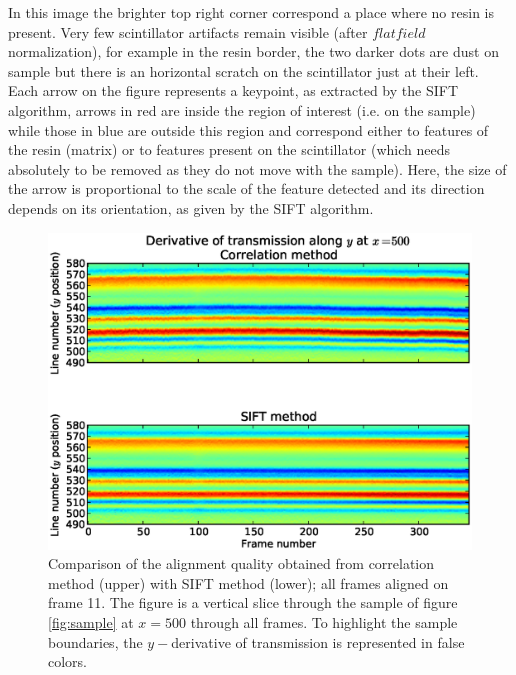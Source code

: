 \documentclass[preprint]{iucr}
\begin{document}
In this image the brighter top right corner correspond a place where no resin is
present. Very few scintillator artifacts remain visible (after $flat field$
normalization), for example in the resin border, the two darker dots are dust on
sample but there is an horizontal scratch on the scintillator just at their
left.
Each arrow on the figure represents a keypoint, as extracted by the SIFT
algorithm, arrows in red are inside the region of interest (i.e. on the sample)
while those in blue are outside this region and
correspond either to features of the resin (matrix) or to features present on
the scintillator (which needs absolutely to be removed as they do not move
with the sample).
Here, the size of the arrow is proportional to the scale of the feature
detected and its direction depends on its orientation, as given by the SIFT algorithm.

\begin{figure}
\label{fig:alignment}
\begin{center}
\includegraphics[width=15cm]{alignment_h.eps}
\caption{Comparison of the alignment quality obtained from correlation method
(upper) with SIFT method (lower); all frames aligned on
frame 11. The figure is a vertical slice through the sample of figure
\ref{fig:sample} at $x=500$ through all frames. To highlight the sample
boundaries, the $y-$derivative of transmission is represented in false colors.}
\end{center}
\end{figure}
\end{document}
